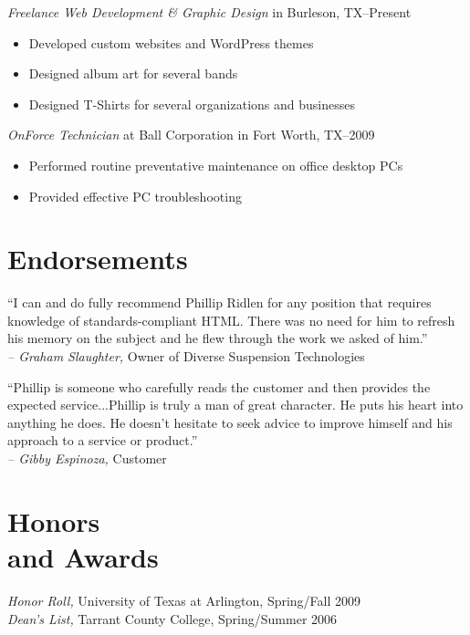 \documentclass[margin]{res}
\begin{document}
\begin{resume}
                {\sl Freelance Web Development \textrm{\&} Graphic Design}
                in Burleson, TX--Present
                \begin{itemize} \itemsep -2pt %
                  \item Developed custom websites and WordPress themes
                  \item Designed album art for several bands
                  \item Designed T-Shirts for several organizations and businesses
                \end{itemize}
                
                {\sl OnForce Technician}
                at Ball Corporation in Fort Worth, TX--2009
                \begin{itemize} \itemsep -2pt %
                  \item Performed routine preventative maintenance on office desktop PCs
                  \item Provided effective PC troubleshooting
                \end{itemize}

      
\section{\textsf{Endorsements}}
                
                ``I can and do fully recommend Phillip Ridlen for any position that requires 
                knowledge of standards-compliant HTML. There was no need for him to refresh his 
                memory on the subject and he flew through the work we asked of him.'' \\
                {\sl -- Graham Slaughter,} Owner of Diverse Suspension Technologies

                ``Phillip is someone who carefully reads the customer and then 
                provides the expected service...Phillip is truly a man of great character. 
                He puts his heart into anything he does. He doesn't hesitate to seek advice 
                to improve himself and his approach to a service or product.'' \\
                {\sl -- Gibby Espinoza,} Customer


\section{\textsf{Honors \\and Awards}}{\sl Honor Roll,} University of Texas at Arlington, Spring/Fall 2009 \\
                {\sl Dean's List,} Tarrant County College, Spring/Summer 2006
                
                
\end{resume}
\end{document}

